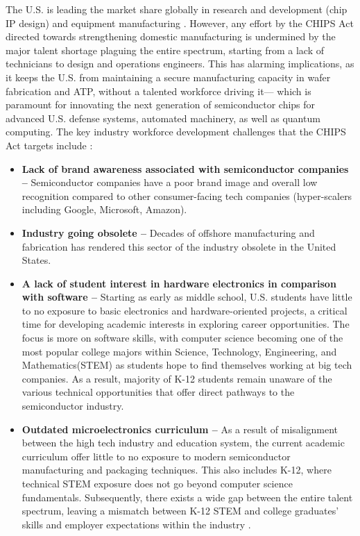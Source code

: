 The U.S. is leading the market share globally in research and development (chip IP design) and equipment manufacturing \cite{fueling_american}. However, any effort by the CHIPS Act directed towards strengthening domestic manufacturing is undermined by the major talent shortage plaguing the entire spectrum, starting from a lack of technicians to design and operations engineers. This has alarming implications, as it keeps the U.S. from maintaining a secure manufacturing capacity in wafer fabrication and ATP, without a talented workforce driving it— which is paramount for innovating the next generation of semiconductor chips for advanced U.S. defense systems, automated machinery, as well as quantum computing. The key industry workforce development challenges that the CHIPS Act targets include \cite{fueling_american}:
\begin{itemize}    

    \item \textbf{Lack of brand awareness associated with semiconductor companies – } Semiconductor companies have a poor brand image and overall low recognition compared to other consumer-facing tech companies (hyper-scalers including Google, Microsoft, Amazon).

    \item \textbf{Industry going obsolete – }Decades of offshore manufacturing and fabrication has rendered this sector of the industry obsolete in the United States.

    \item \textbf{A lack of student interest in hardware electronics in comparison with software –} Starting as early as middle school, U.S. students have little to no exposure to basic electronics and hardware-oriented projects, a critical time for developing academic interests in exploring career opportunities. The focus is more on software skills, with computer science becoming one of the most popular college majors within Science, Technology, Engineering, and Mathematics(STEM) as students hope to find themselves working at big tech companies. As a result, majority of K-12 students remain unaware of the various technical opportunities that offer direct pathways to the semiconductor industry.
    
    \item \textbf{Outdated microelectronics curriculum – }As a result of misalignment between the high tech industry and education system, the current academic curriculum offer little to no exposure to modern semiconductor manufacturing and packaging techniques. This also includes K-12, where technical STEM exposure does not go beyond computer science fundamentals. Subsequently, there exists a wide gap between the entire talent spectrum, leaving a mismatch between K-12 STEM and college graduates’ skills and employer expectations within the industry .


\end{itemize}
